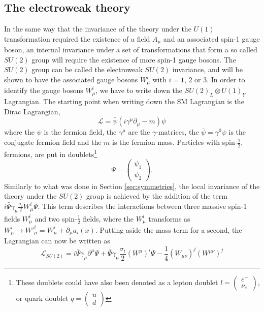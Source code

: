 \subsection*{The electroweak theory} 
\noindent\justify
In the same way that the invariance of the theory under the $U(1)$ transformation required the existence of a field $A_{\mu}$ and an associated spin-1 gauge boson, an internal invariance under a set of transformations that form a so called $SU(2)$ group will require the existence of more spin-1 gauge bosons. 
The $SU(2)$ group can be called the electroweak $SU(2)$ invariance, and will be shown to have the associated gauge bosons $W_{\mu}^{i}$ with $i=1$, $2$ or $3$.
In order to identify the gauge bosons $W_{\mu}^{i}$, we have to write down the $SU(2)_{L}\otimes U(1)_{Y}$ Lagrangian. 
The starting point when writing down the SM Lagrangian is the Dirac Lagrangian, 
\begin{equation}
\mathcal{L}=\bar{\psi}(i\gamma^{\mu}\partial_{\mu}-m)\psi
\end{equation}                                               
where the $\psi$ is the fermion field, the $\gamma^{\mu}$ are the $\gamma$-matrices, the $\bar{\psi}=\gamma^{0}\psi$ is the conjugate fermion field and the $m$ is the fermion mass. 
Particles with spin-$\frac{1}{2}$, fermions, are put in doublets\footnote{These doublets could have also been denoted as a lepton doublet $l=\begin{pmatrix} e^{-}\\ \nu_{e} \end{pmatrix}$, or quark doublet $q=\begin{pmatrix} u\\ d \end{pmatrix}$}
\begin{equation}
\Psi=\begin{pmatrix} \psi_{1}\\ \psi_{2} \end{pmatrix}.
\end{equation}
Similarly to what was done in Section \ref{sec:symmetries}, the local invariance of the theory under the $SU(2)$ group is achieved by the addition of the term $i\bar{\Psi}\gamma_{\mu}\frac{\sigma_{i}}{2}W_{\mu}^{i}\Psi$. 
This term describes the interactions between three massive spin-1 fields $W^{i}_{\mu}$ and two spin-$\frac{1}{2}$ fields, where the $W^{i}_{\mu}$ transforms as $W^{i}_{\mu}\rightarrow W'^{i}_{\mu}=W^{i}_{\mu}+\partial_{\mu}a_{i}(x)$. 
Putting aside the mass term for a second, the Lagrangian can now be written as
\begin{equation}
\mathcal{L}_{SU(2)}=i\bar{\Psi}\gamma_{\mu}\partial^{\mu}\Psi+ \bar{\Psi}\gamma_{\mu}\frac{\sigma_{i}}{2}(W^{\mu})^{i}\Psi-\frac{1}{4}(W_{\mu\nu})^{j}(W^{\mu\nu})^{j} 
\label{eq:dirac}
\end{equation}                                               
